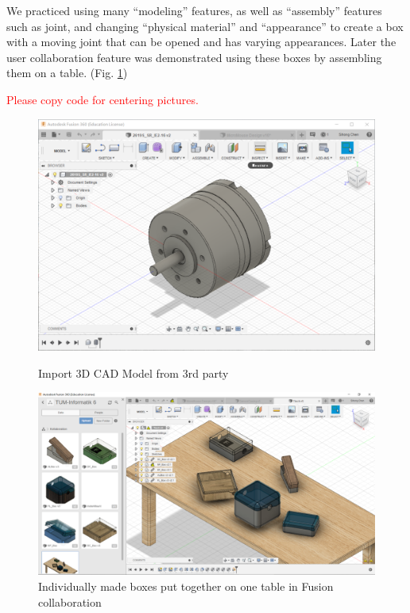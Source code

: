 We practiced using many “modeling” features, as well as “assembly” features such as joint, and changing “physical material” and “appearance” to create a box with a moving joint that can be opened and has varying appearances. Later the user collaboration feature was demonstrated using these boxes by assembling them on a table. (Fig. \ref{fig:fusion_collab_table})

\textcolor{red}{Please copy code for centering pictures.}

\begin{figure}[htb]
    \begin{minipage}[b]{0.4\textwidth}
    	\includegraphics[width=\textwidth]{figures/Casing/FusionImport.PNG}
    	\caption{Import 3D CAD Model from 3rd party}
    	\label{fig:fusion_import}
  	\end{minipage}
 
  	\begin{minipage}[b]{0.4\textwidth}
  	  \includegraphics[width=\textwidth]{figures/Casing/FusionCollaborationTable.PNG}
  	  \caption{Individually made boxes put together on one table in Fusion collaboration}
  	  \label{fig:fusion_collab_table}
  	\end{minipage}
\end{figure}

